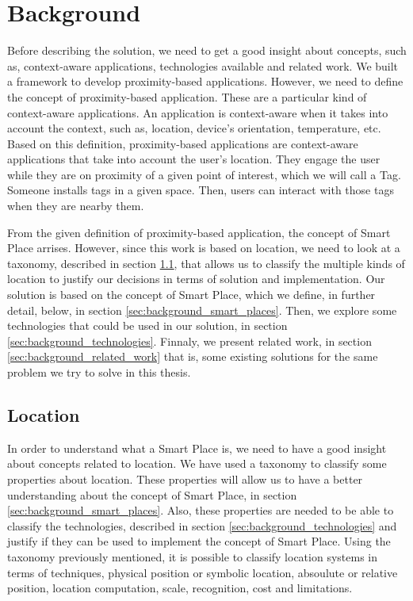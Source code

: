 
\chapter{Background}
\label{chapter:background}
Before describing the solution, we need to get a good insight about concepts, such as, context-aware applications, technologies available and related work.
We built a framework to develop proximity-based applications.
However, we need to define the concept of proximity-based application.
These are a particular kind of context-aware applications.
An application is context-aware when it takes into account the context, such as, location, device's orientation, temperature, etc.
Based on this definition, proximity-based applications are context-aware applications that take into account the user's location.
They engage the user while they are on proximity of a given point of interest, which we will call a Tag.
Someone installs tags in a given space.
Then, users can interact with those tags when they are nearby them.

From the given definition of proximity-based application, the concept of Smart Place arrises.
However, since this work is based on location, we need to look at a taxonomy, described in section \ref{sec:background_location}, that allows us to classify the multiple kinds of location to justify our decisions in terms of solution and implementation.
Our solution is based on the concept of Smart Place, which we define, in further detail, below, in section \ref{sec:background_smart_places}.
Then, we explore some technologies that could be used in our solution, in section \ref{sec:background_technologies}.
Finnaly, we present related work,
in section \ref{sec:background_related_work} that is, some existing solutions for the same problem we try to solve in this thesis.

\section{Location}
\label{sec:background_location}
In order to understand what a Smart Place is, we need to have a good insight about concepts related to location.
We have used a taxonomy\cite{location} to classify some properties about location.
These properties will allow us to have a better understanding about the concept of Smart Place, in section \ref{sec:background_smart_places}.
Also, these properties are needed to be able to classify the technologies, described in section \ref{sec:background_technologies} and justify if they can be used to implement the concept of Smart Place.
Using the taxonomy previously mentioned, it is possible to classify location systems in terms of techniques, physical position or symbolic location, absoulute or relative position, location computation, scale, recognition, cost and limitations.

